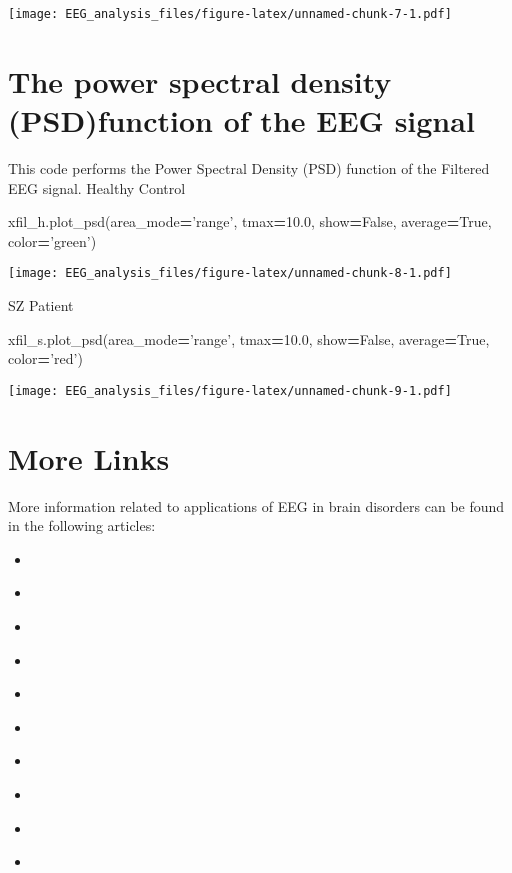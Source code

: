 \documentclass[]{book}
\newenvironment{Shaded}{\begin{snugshade}}{\end{snugshade}}
\newcommand{\FloatTok}[1]{\textcolor[rgb]{0.00,0.00,0.81}{#1}}
\newcommand{\NormalTok}[1]{#1}
\newcommand{\OperatorTok}[1]{\textcolor[rgb]{0.81,0.36,0.00}{\textbf{#1}}}
\newcommand{\StringTok}[1]{\textcolor[rgb]{0.31,0.60,0.02}{#1}}
\newcommand{\VariableTok}[1]{\textcolor[rgb]{0.00,0.00,0.00}{#1}}
\providecommand{\tightlist}{%
  \setlength{\itemsep}{0pt}\setlength{\parskip}{0pt}}
\begin{document}
\texttt{[image: EEG\_analysis\_files/figure-latex/unnamed-chunk-7-1.pdf]}

\hypertarget{the-power-spectral-density-psdfunction-of-the-eeg-signal}{%
\section{The power spectral density (PSD)function of the EEG signal}\label{the-power-spectral-density-psdfunction-of-the-eeg-signal}}

This code performs the Power Spectral Density (PSD) function of the Filtered EEG signal.
Healthy Control

\begin{Shaded}
\begin{Highlighting}[]
\NormalTok{xfil_h.plot_psd(area_mode}\OperatorTok{=}\StringTok{'range'}\NormalTok{, tmax}\OperatorTok{=}\FloatTok{10.0}\NormalTok{, show}\OperatorTok{=}\VariableTok{False}\NormalTok{, average}\OperatorTok{=}\VariableTok{True}\NormalTok{, color}\OperatorTok{=}\StringTok{'green'}\NormalTok{)}
\end{Highlighting}
\end{Shaded}

\texttt{[image: EEG\_analysis\_files/figure-latex/unnamed-chunk-8-1.pdf]}

SZ Patient

\begin{Shaded}
\begin{Highlighting}[]
\NormalTok{xfil_s.plot_psd(area_mode}\OperatorTok{=}\StringTok{'range'}\NormalTok{, tmax}\OperatorTok{=}\FloatTok{10.0}\NormalTok{, show}\OperatorTok{=}\VariableTok{False}\NormalTok{, average}\OperatorTok{=}\VariableTok{True}\NormalTok{, color}\OperatorTok{=}\StringTok{'red'}\NormalTok{)}
\end{Highlighting}
\end{Shaded}

\texttt{[image: EEG\_analysis\_files/figure-latex/unnamed-chunk-9-1.pdf]}

\hypertarget{more-links}{%
\section{More Links}\label{more-links}}

More information related to applications of EEG in brain disorders can be found in the following articles:

\begin{itemize}
\tightlist
\item
  \citep{T.Krishnan2016}
\item
  \citep{Thanaraj2014}
\item
  \citep{Krishnan2017}
\item
  \citep{Krishnan2017a}
\item
  \citep{Thanaraj2017}
\item
  \citep{Abhinaya2016}
\item
  \citep{Johannesen2016}
\item
  \citep{Gotz2017}
\item
  \citep{Thilakvathi2017}
\item
  \citep{Olejarczyk2017}
\end{itemize}


\end{document}
